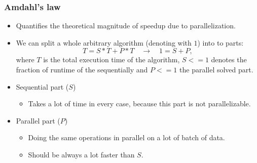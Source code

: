 \begin{frame}
\frametitle{Amdahl's law}

\begin{itemize}
	\item<1-> Quantifies the theoretical magnitude of speedup due to parallelization.
	\item<2-> We can split a whole arbitrary algorithm (denoting with $1$) into to parts:
	\begin{equation} \label{eq:1}
		T = S*T + P*T
		\quad \to \quad
		1 = S + P,
	\end{equation}
	where $T$ is the total execution time of the algorithm, $S <= 1$ denotes the fraction of runtime of the sequentially and $P <= 1$ the parallel solved part.
	\item<3-> Sequential part ($S$)
	\begin{itemize}
		\item<3-> Takes a lot of time in every case, because this part is not parallelizable.
	\end{itemize}
	\item<3-> Parallel part ($P$)
	\begin{itemize}
		\item<3-> Doing the same operations in parallel on a lot of batch of data.
		\item<3-> Should be always a lot faster than $S$.
	\end{itemize}
\end{itemize}

\end{frame}